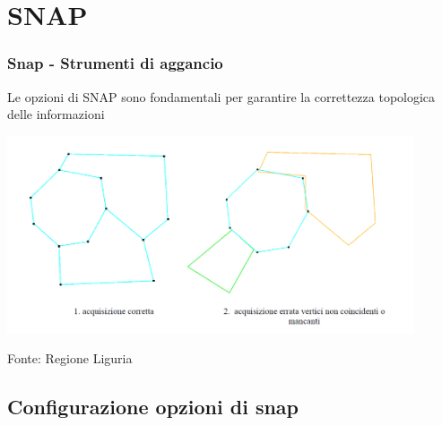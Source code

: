 \documentclass{beamer}
\begin{document}
{%
	 	


\section{SNAP}

\begin{frame}
   \frametitle{Snap - Strumenti di aggancio}
   Le opzioni di SNAP sono fondamentali per garantire la correttezza topologica delle informazioni 
   
		    \begin{center}
			\includegraphics[width=0.90\textwidth] {digitizing_pics/correttezza.png}
		    \end{center}
    \begin{flushright}
	    \tiny{Fonte: Regione Liguria}
    \end{flushright}
\end{frame}

\subsection{Configurazione opzioni di snap}

}
\end{document}
